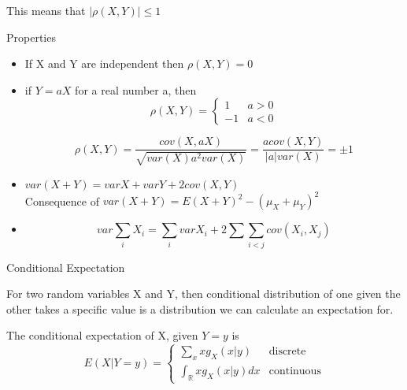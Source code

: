 \documentclass{report}
\begin{document}
\begin{description}
\begin{mdframed}
            This means that $|\rho(X,Y)| \le 1$
        \end{mdframed}
    \item {\large Properties} 
        \begin{mdframed}
            \begin{itemize}
                \item If X and Y are independent then $\rho(X,Y) = 0$
                \item if $Y = aX$ for a real number a, then
                     \begin{displaymath}
                    \rho(X,Y) = 
                    \begin{cases}
                        1 & a > 0\\ 
                        -1 & a < 0
                    \end{cases}
                    \end{displaymath}

                    \begin{displaymath}
                        \rho(X,Y) = \frac{cov(X, aX)}{\sqrt{var(X)a^2var(X)}}
                        = \frac{acov(X,Y)}{|a|var(X)} = \pm 1
                    \end{displaymath}
                    
                \item $var(X + Y) = varX + varY + 2cov(X,Y)$
                    \\
                    Consequence of $var(X+Y) = E(X+Y)^2 - (\mu_X + \mu_Y)^2$
                \item 
                    \begin{displaymath}
                    var \sum_i X_i = \sum_i var X_i +
                    2 \sum \sum_{i < j} cov(X_i, X_j)
                    \end{displaymath}
            \end{itemize}
        \end{mdframed}
        \pagebreak
    \item {\large Conditional Expectation} 
        \begin{mdframed}
           For two random variables X and Y, then conditional
           distribution of one given the other takes a specific
           value is a distribution we can calculate an expectation
           for.

           \vspace{10}

           The conditional expectation of X, given $Y=y$ is
            \begin{displaymath}
            E(X|Y=y) = 
            \begin{cases}
                \sum_x xg_X(x|y) & \textrm{discrete}\\ 
                \int_{\mathbb{R}} xg_X(x|y) dx & \textrm{continuous}
            \end{cases}
           \end{displaymath}


\end{mdframed}
\end{description}
\end{document}
